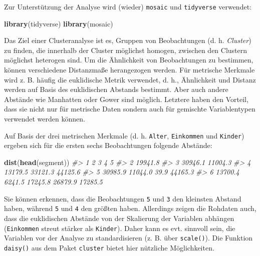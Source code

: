 \documentclass[12pt,]{book}
\makeatletter
\newenvironment{Shaded}{\begin{snugshade}}{\end{snugshade}}
\newcommand{\KeywordTok}[1]{\textcolor[rgb]{0.13,0.29,0.53}{\textbf{{#1}}}}
\newcommand{\CommentTok}[1]{\textcolor[rgb]{0.56,0.35,0.01}{\textit{{#1}}}}
\newcommand{\NormalTok}[1]{{#1}}
\newenvironment{kframe}{%
\medskip{}
\setlength{\fboxsep}{.8em}
 \def\at@end@of@kframe{}%
 \ifinner\ifhmode%
  \def\at@end@of@kframe{\end{minipage}}%
  \begin{minipage}{\columnwidth}%
 \fi\fi%
 \def\FrameCommand##1{\hskip\@totalleftmargin \hskip-\fboxsep
 \colorbox{shadecolor}{##1}\hskip-\fboxsep
     \hskip-\linewidth \hskip-\@totalleftmargin \hskip\columnwidth}%
 \MakeFramed {\advance\hsize-\width
   \@totalleftmargin\z@ \linewidth\hsize
   \@setminipage}}%
 {\par\unskip\endMakeFramed%
 \at@end@of@kframe}
\renewenvironment{Shaded}{\begin{kframe}}{\end{kframe}}
\makeatother
\begin{document}
Zur Unterstützung der Analyse wird (wieder) \texttt{mosaic} und
\texttt{tidyverse} verwendet:

\begin{Shaded}
\begin{Highlighting}[]
\KeywordTok{library}\NormalTok{(tidyverse)}
\KeywordTok{library}\NormalTok{(mosaic)}
\end{Highlighting}
\end{Shaded}

Das Ziel einer Clusteranalyse ist es, Gruppen von Beobachtungen (d. h.
\emph{Cluster}) zu finden, die innerhalb der Cluster möglichst homogen,
zwischen den Clustern möglichst heterogen sind. Um die Ähnlichkeit von
Beobachtungen zu bestimmen, können verschiedene Distanzmaße herangezogen
werden. Für metrische Merkmale wird z. B. häufig die euklidische Metrik
verwendet, d. h., Ähnlichkeit und Distanz werden auf Basis des
euklidischen Abstands bestimmt. Aber auch andere Abstände wie Manhatten
oder Gower sind möglich. Letztere haben den Vorteil, dass sie nicht nur
für metrische Daten sondern auch für gemischte Variablentypen verwendet
werden können.

Auf Basis der drei metrischen Merkmale (d. h. \texttt{Alter},
\texttt{Einkommen} und \texttt{Kinder}) ergeben sich für die ersten
sechs Beobachtungen folgende Abstände:

\begin{Shaded}
\begin{Highlighting}[]
\KeywordTok{dist}\NormalTok{(}\KeywordTok{head}\NormalTok{(segment))}
\CommentTok{#>         1       2       3       4       5}
\CommentTok{#> 2 19941.8                                }
\CommentTok{#> 3 30946.1 11004.3                        }
\CommentTok{#> 4 13179.5 33121.3 44125.6                }
\CommentTok{#> 5 30985.9 11044.0    39.9 44165.3        }
\CommentTok{#> 6 13700.4  6241.5 17245.8 26879.9 17285.5}
\end{Highlighting}
\end{Shaded}

Sie können erkennen, dass die Beobachtungen \texttt{5} und \texttt{3}
den kleinsten Abstand haben, während \texttt{5} und \texttt{4} den
größten haben. Allerdings zeigen die Rohdaten auch, dass die
euklidischen Abstände von der Skalierung der Variablen abhängen
(\texttt{Einkommen} streut stärker als \texttt{Kinder}). Daher kann es
evt. sinnvoll sein, die Variablen vor der Analyse zu standardisieren (z.
B. über \texttt{scale()}). Die Funktion \texttt{daisy()} aus dem Paket
\texttt{cluster} bietet hier nützliche Möglichkeiten.
\end{document}
